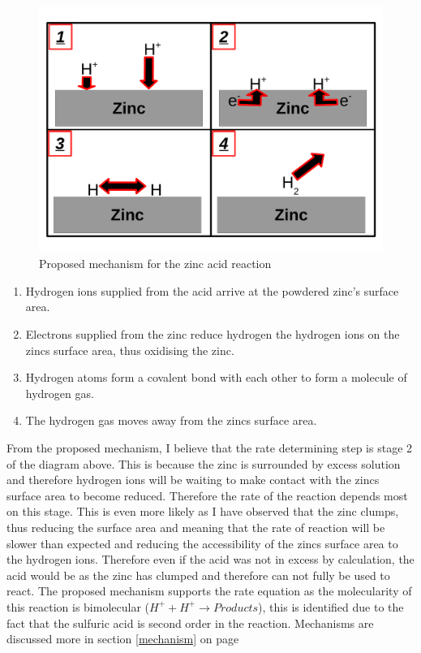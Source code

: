 \begin{figure}[H]
    \includegraphics[width=\textwidth]{./Analysis/Images/UncatalysedMechanism.pdf}
    \caption{Proposed mechanism for the zinc acid reaction} \label{fig:uncatalysedMechanism}
\end{figure}

\begin{enumerate}
\item Hydrogen ions supplied from the acid arrive at the powdered zinc's surface area.
\item Electrons supplied from the zinc reduce hydrogen the hydrogen ions on the zincs surface area, thus oxidising the zinc.
\item Hydrogen atoms form a covalent bond with each other to form a molecule of hydrogen gas.
\item The hydrogen gas moves away from the zincs surface area.
\end{enumerate}

From the proposed mechanism, I believe that the rate determining step is stage 2 of the diagram above. This is because the zinc is surrounded by excess solution and therefore hydrogen ions will be waiting to make contact with the zincs surface area to become reduced. Therefore the rate of the reaction depends most on this stage. This is even more likely as I have observed that the zinc clumps, thus reducing the surface area and meaning that the rate of reaction will be slower than expected and reducing the accessibility of the zincs surface area to the hydrogen ions. Therefore even if the acid was not in excess by calculation, the acid would be as the zinc has clumped and therefore can not fully be used to react. The proposed mechanism supports the rate equation as the molecularity of this reaction is bimolecular ($H^+ + H^+ \rightarrow Products$), this is identified due to the fact that the sulfuric acid is second order in the reaction. Mechanisms are discussed more in section \ref{mechanism} on page \pageref{mechanism}



